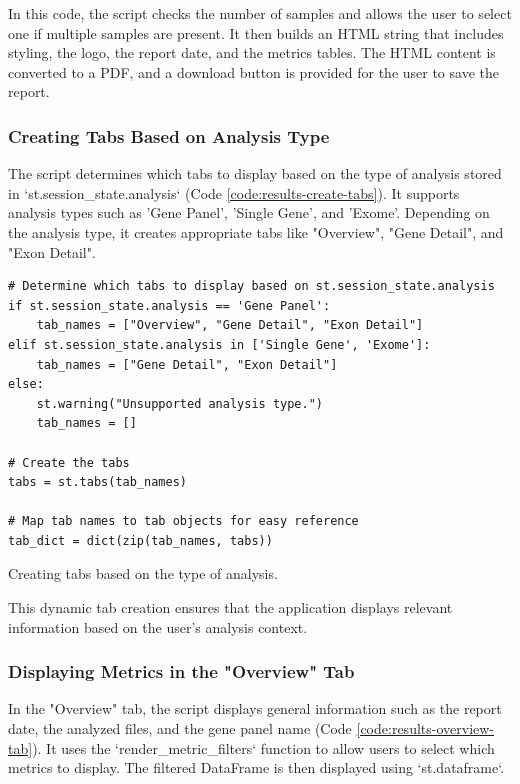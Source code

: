 In this code, the script checks the number of samples and allows the user to select one if multiple samples are present. It then builds an HTML string that includes styling, the logo, the report date, and the metrics tables. The HTML content is converted to a PDF, and a download button is provided for the user to save the report.

\subsubsection{\textbf{Creating Tabs Based on Analysis Type}}

The script determines which tabs to display based on the type of analysis stored in `st.session\_state.analysis` (Code \ref{code:results-create-tabs}). It supports analysis types such as 'Gene Panel', 'Single Gene', and 'Exome'. Depending on the analysis type, it creates appropriate tabs like "Overview", "Gene Detail", and "Exon Detail".

\begin{longlisting}
\begin{verbatim}
# Determine which tabs to display based on st.session_state.analysis
if st.session_state.analysis == 'Gene Panel':
    tab_names = ["Overview", "Gene Detail", "Exon Detail"]
elif st.session_state.analysis in ['Single Gene', 'Exome']:
    tab_names = ["Gene Detail", "Exon Detail"]
else:
    st.warning("Unsupported analysis type.")
    tab_names = []

# Create the tabs
tabs = st.tabs(tab_names)

# Map tab names to tab objects for easy reference
tab_dict = dict(zip(tab_names, tabs))
\end{verbatim}
\caption{Creating tabs based on the type of analysis.}
\label{code:results-create-tabs}
\end{longlisting}

This dynamic tab creation ensures that the application displays relevant information based on the user's analysis context.

\subsubsection{\textbf{Displaying Metrics in the "Overview" Tab}}

In the "Overview" tab, the script displays general information such as the report date, the analyzed files, and the gene panel name (Code \ref{code:results-overview-tab}). It uses the `render\_metric\_filters` function to allow users to select which metrics to display. The filtered DataFrame is then displayed using `st.dataframe`.


